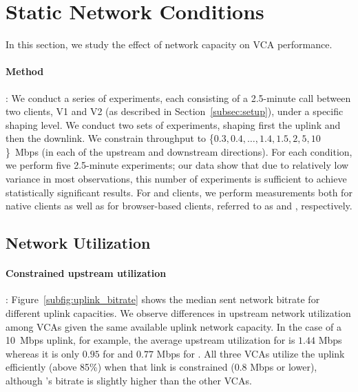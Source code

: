 \section{Static Network Conditions}\label{sec:static}

In this section, we study the effect of network capacity on VCA performance.

\paragraph{Method}: We conduct a series of experiments, each consisting of a
2.5-minute call between two clients, V1 and V2 (as described in
Section~\ref{subsec:setup}), under a specific shaping level. We conduct two
sets of experiments, shaping first the uplink and then the downlink.  We
constrain throughput to \{$0.3, 0.4, \dots, 1.4, 1.5, 2, 5, 10$\}~Mbps (in
each of the upstream and downstream directions). For each condition, we perform five 2.5-minute experiments; our
data show that due to relatively low variance in most observations, this
number of experiments is sufficient to achieve statistically significant
results.  For \zoom and \teams clients, we perform measurements both for
native clients as well as for browser-based clients, referred to as
\zoombrowser and \teamsbrowser, respectively. 





\subsection{Network Utilization}
\label{subsec:network_utilization}

\paragraph{Constrained upstream utilization}: Figure~\ref{subfig:uplink_bitrate} shows the
median sent network bitrate for different uplink capacities. We observe differences in upstream network
utilization among VCAs given the same available uplink network capacity. In
the case of a 10~Mbps uplink, for example, the average upstream utilization for
\teamsnative is $1.44$ Mbps whereas it is only $0.95$ for \meet and $0.77$
Mbps for \zoom. All three VCAs utilize the uplink efficiently (above 85\%)
when that link is constrained (0.8 Mbps or lower), although \meet's
bitrate is slightly higher than the other VCAs.  

